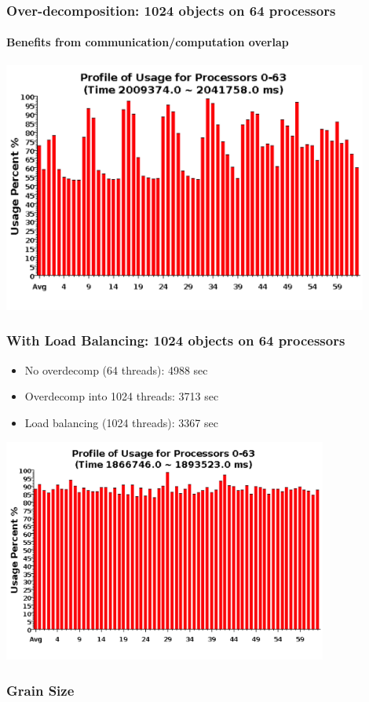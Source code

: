 \begin{frame}[fragile]
\frametitle{Over-decomposition: 1024 objects on 64 processors}
\framesubtitle{Benefits from communication/computation overlap}
\begin{center}\includegraphics[width=0.9\textwidth]{../figures/usageVirtual.png}\end{center}
\end{frame}


\begin{frame}[fragile]
\frametitle{With Load Balancing: 1024 objects on 64 processors}
\begin{center}
\begin{itemize}
\item No overdecomp (64 threads): 4988 sec
\item Overdecomp into 1024 threads: 3713 sec
\item Load balancing (1024 threads): 3367 sec
\end{itemize}
\includegraphics[width=0.8\textwidth]{../figures/usageLB.png}
\end{center}
\end{frame}

\begin{frame}
\frametitle{Grain Size}
\end{frame}
